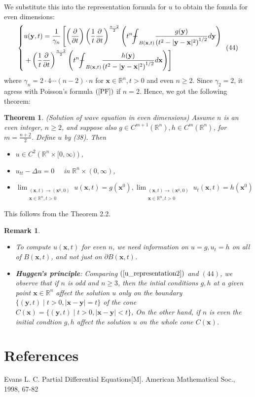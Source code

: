 \documentclass[10pt]{article}
\def\rr{{\mathbb R}}
\def\vc{{\mathbf x}}
\def\vcc{{\mathbf y}}
\newtheorem{theorem}{Theorem}[section]
\newtheorem{remark}{Remark}[section]
\newcommand\tbbint{{-\mkern -16mu\int}}
\newcommand\dbbint{{-\mkern -19mu\int}}
\newcommand\bbint{
{\mathchoice{\dbbint}{\tbbint}{\tbbint}{\tbbint}}
}
\begin{document}
We substitute this into the representation formula for $u$ to obtain the fomula for even dimensions:
$$
\left\{\begin{aligned}
& u(\vcc, t)=\frac{1}{\gamma_{n}}\left[\left(\frac{\partial}{\partial t}\right)\left(\frac{1}{t} \frac{\partial}{\partial t}\right)^{\frac{n-2}{2}}\left(t^{n} \bbint_{B(\vc, t)} \frac{g(\vcc)}{\left(t^{2}-|\vcc-\vc|^{2}\right)^{1 / 2}} d \vcc\right)\right. \\
&\left.+\left(\frac{1}{t} \frac{\partial}{\partial t}\right)^{\frac{n-2}{2}}\left(t^{n} \bbint_{B(\vc, t)} \frac{h(\vcc)}{\left(t^{2}-|\vcc-\vc|^{2}\right)^{1 / 2}} d \vc\right)\right]
\end{aligned}\right. \; (44)
$$
where $\gamma_n = 2\cdot 4 \cdots (n-2) \cdot n$ for $\vc \in \mathbb{R}^{n}, t>0$ and even $n \geq 2$. Since $\gamma_2 = 2$, it agress with Poisson's formula $(\ref{PF})$ if $n=2$. Hence, we got the following theorem:
\begin{theorem}(Solution of wave equation in even dimensions)
  Assume $n$ is an even integer, $n \geq 2$, and suppose also $g \in C^{m+1}\left(\mathbb{R}^{n}\right), h \in C^{m}\left(\mathbb{R}^{n}\right)$, for $m=\frac{n+2}{2}$. Define $u$ by (38). Then
  \begin{itemize}
    \item [(i)] $u \in C^{2}\left(\mathbb{R}^{n} \times[0, \infty)\right)$,
    \item [(ii)] $u_{t t}-\Delta u=0 \quad$ in $\mathbb{R}^{n} \times(0, \infty)$,
    \item [(iii)] $\lim _{\substack{(\vc, t) \rightarrow\left(\vc^{0}, 0\right) \\ \vc \in \mathbb{R}^{n}, t>0}} u(\vc, t)=g\left(\vc^{0}\right), \lim _{\substack{(\vc, t) \rightarrow\left(\vc^{0}, 0\right) \\ \vc \in \mathbb{R}^{n}, t>0}} u_{t}(\vc, t)=h\left(\vc^{0}\right)$
  \end{itemize}
\end{theorem}
This follows from the Theorem 2.2.
\begin{remark}
    \begin{itemize} 
        \item [(i)] To compute $u(\vc,t)$ for even $n$, we need information on $u=g, u_t = h$ on all of $B(\vc, t)$, and not just on $\partial B(\vc, t)$.
        \item [(ii)] \textbf{Huggen's principle}: Comparing $(\ref{u_representation2})$ and $(44)$, we observe that if $n$ is odd and $n\geq 3$, then the intial conditions $g, h$ at a given point $\vc \in \rr^n$ affect the solution $u$ only on the boundary $\{(\vcc,t)\;|\;t > 0, |\vc-\vcc| = t\}$ of the cone $C(\vc) = \{(\vcc,t)\;|\; t>0, |\vc-\vcc|<t\}$, On the other hand, if $n$ is even the initial condtion $g, h$ affect the solution $u$ on the whole cone $C(\vc)$.
    \end{itemize}
\end{remark}
\section{References}
 Evans L. C. Partial Differential Equations[M]. American Mathematical Soc., 1998, 67-82
\end{document}
